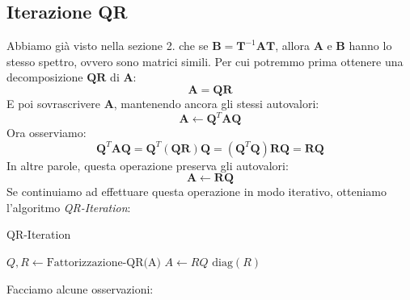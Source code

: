 \documentclass{article}
\begin{document}
        \subsection{Iterazione QR}
            Abbiamo già visto nella sezione 2. che se $\mathbf{B} = \mathbf{T}^{-1}\mathbf{AT}$, allora $\mathbf{A}$ e 
            $\mathbf{B}$ hanno lo stesso spettro, ovvero sono matrici simili. Per cui potremmo prima ottenere una decomposizione 
            $\mathbf{QR}$ di $\mathbf{A}$:
            \[\mathbf{A} = \mathbf{QR}\]
            E poi sovrascrivere $\mathbf{A}$, mantenendo ancora gli stessi autovalori:
            \[\mathbf{A} \gets \mathbf{Q}^T\mathbf{AQ}\]
            Ora osserviamo:
            \[\mathbf{Q}^T\mathbf{AQ} = \mathbf{Q}^T(\mathbf{QR})\mathbf{Q} = (\mathbf{Q}^T\mathbf{Q})\mathbf{RQ} = \mathbf{RQ}\]
            In altre parole, questa operazione preserva gli autovalori:
            \[\mathbf{A} \gets \mathbf{RQ}\]
            Se continuiamo ad effettuare questa operazione in modo iterativo, otteniamo l'algoritmo \emph{QR-Iteration}: 
\newpage
            \begin{algorithm}
                \caption{QR-Iteration}
                \label{QR-Iteration}
                \begin{algorithmic} %
                            \State $Q,R \gets \text{Fattorizzazione-QR(A)}$ 
                            \State $A \gets RQ$
                        \EndFor
                        \State \Return $\text{diag}({R})$
                    \EndFunction
                \end{algorithmic}
            \end{algorithm}
            Facciamo alcune osservazioni:
\end{document}
